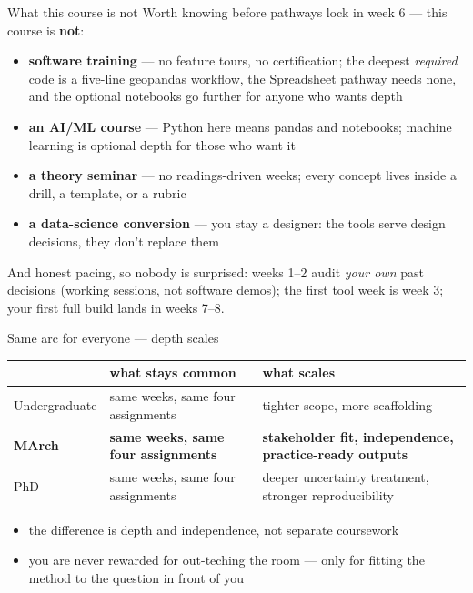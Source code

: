\documentclass[aspectratio=169,10pt]{beamer}
\newcommand{\muted}[1]{{\color{cMute}#1}}
\begin{document}
\begin{frame}{What this course is not}
  Worth knowing before pathways lock in week 6 --- this course is \textbf{not}:
  \begin{itemize}
    \item \textbf{software training} --- no feature tours, no certification;
          the deepest \emph{required} code is a five-line geopandas workflow,
          the Spreadsheet pathway needs none, and the optional notebooks go
          further for anyone who wants depth
    \item \textbf{an AI/ML course} --- Python here means pandas and notebooks;
          machine learning is optional depth for those who want it
    \item \textbf{a theory seminar} --- no readings-driven weeks; every concept
          lives inside a drill, a template, or a rubric
    \item \textbf{a data-science conversion} --- you stay a designer: the
          tools serve design decisions, they don't replace them
  \end{itemize}
  \vspace{2mm}
  And honest pacing, so nobody is surprised: weeks 1--2 audit \emph{your own}
  past decisions (working sessions, not software demos); the first tool week
  is week 3; your first full build lands in weeks 7--8.
\end{frame}

\begin{frame}{Same arc for everyone --- depth scales}
  \small
  \begin{tabular}{@{}>{\raggedright\arraybackslash}p{}>{\raggedright\arraybackslash}p{}>{\raggedright\arraybackslash}p{}@{}}
    & \muted{what stays common} & \muted{what scales}\\
    \midrule
    Undergraduate & same weeks, same four assignments & tighter scope, more scaffolding\\[1.5mm]
    \textbf{MArch} & \textbf{same weeks, same four assignments} &
      \textbf{stakeholder fit, independence, practice-ready outputs}\\[1.5mm]
    PhD & same weeks, same four assignments & deeper uncertainty treatment, stronger reproducibility\\
  \end{tabular}
  \vspace{4mm}

  \begin{itemize}
    \item the difference is \alert{depth and independence, not separate coursework}
    \item you are never rewarded for out-teching the room --- only for fitting
          the method to the question in front of you
  \end{itemize}
\end{frame}
\end{document}
